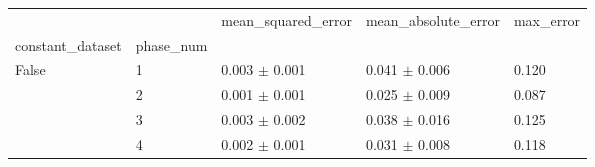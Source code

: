 \begin{tabular}{lllll}
\toprule
 &  & mean_squared_error & mean_absolute_error & max_error \\
constant_dataset & phase_num &  &  &  \\
\midrule
\multirow[t]{4}{*}{False} & 1 & 0.003 $\pm$ 0.001 & 0.041 $\pm$ 0.006 & 0.120 \\
 & 2 & 0.001 $\pm$ 0.001 & 0.025 $\pm$ 0.009 & 0.087 \\
 & 3 & 0.003 $\pm$ 0.002 & 0.038 $\pm$ 0.016 & 0.125 \\
 & 4 & 0.002 $\pm$ 0.001 & 0.031 $\pm$ 0.008 & 0.118 \\
\cline{1-5}
\bottomrule
\end{tabular}
